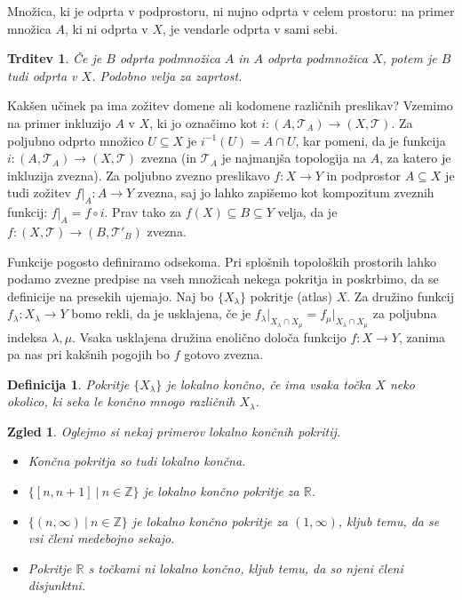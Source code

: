 \documentclass[10pt, a4paper]{article}
\newtheorem{trditev}[izr]{Trditev}
\newtheorem{defi}{Definicija}[section]
\newenvironment{noticeB}{%
  \tcolorbox[%
  notitle,
  empty,
  enhanced,  %
  breakable,
  coltext=black,
  colback=white, 
  fontupper=\rmfamily,
  parbox=false,
  noparskip,
  sharp corners,
  boxrule=-1pt,  %
  frame hidden,
  left=7pt,  %
  right=7pt,
  top=5pt,
  bottom=5pt,
  before skip=2.5ex plus 2pt,
  after skip=2.5ex plus 2pt,
  borderline west = {1.5pt}{-0.1pt}{blue!30!black}, %
  overlay unbroken and last={%
    \draw[color=black, line width=1.25pt]
    ($(frame.south west)+(1.pt, -0.1pt)$) -- ++(2em, 0);
  }
  ]}
{\endtcolorbox}
\newenvironment{definicija}{\begin{defi}\begin{noticeB}}{%
    \end{noticeB}\end{defi}}
\newtheorem{zgled}{Zgled}[section]
\newcommand{\Z}{\mathbb {Z}}
\newcommand{\R}{\mathbb {R}}
\newcommand{\topo}[1]{\mathcal{#1}}
\begin{document}
Množica, ki je odprta v podprostoru, ni nujno odprta v celem prostoru:
na primer množica $A$, ki ni odprta v $X$, je vendarle odprta v sami sebi.

\begin{trditev}
  Če je $B$ odprta podmnožica $A$ in $A$ odprta podmnožica $X$, potem je $B$ tudi odprta v $X$.
  Podobno velja za zaprtost.
\end{trditev}

Kakšen učinek pa ima zožitev domene ali kodomene različnih preslikav?
Vzemimo na primer inkluzijo $A$ v $X$, ki jo označimo kot $i: (A, \topo{T}_A) \to (X, \topo{T})$.
Za poljubno odprto množico $U \subseteq X$ je $i^{-1} (U) = A \cap U$,
kar pomeni, da je funkcija $i: (A, \topo{T}_A) \to (X, \topo{T})$ zvezna (in $\topo{T}_A$ je najmanjša topologija na $A$,
za katero je inkluzija zvezna).
Za poljubno zvezno preslikavo $f: X \to Y$ in podprostor $A \subseteq X$
je tudi zožitev $f \big|_A : A \to Y$ zvezna, saj jo lahko zapišemo kot kompozitum zveznih funkcij: $f \big|_A = f \circ i$.
Prav tako za $f(X) \subseteq B \subseteq Y$ velja, da je $f: (X, \topo{T}) \to (B, \topo{T}'_B)$ zvezna.

Funkcije pogosto definiramo odsekoma. Pri splošnih topoloških prostorih lahko podamo zvezne predpise na vseh množicah nekega pokritja
in poskrbimo, da se definicije na presekih ujemajo. Naj bo $\{X_\lambda\}$ pokritje (atlas) $X$.
Za družino funkcij $f_\lambda: X_\lambda \to Y$ bomo rekli, da je usklajena, če je 
$f_\lambda \big|_{X_\lambda \cap X_\mu} = f_\mu \big|_{X_\lambda \cap X_\mu}$ za poljubna indeksa $\lambda, \mu$.
Vsaka usklajena družina enolično določa funkcijo $f: X \to Y$, zanima pa nas pri kakšnih pogojih bo $f$ gotovo zvezna.

\begin{definicija}
  Pokritje $\{X_\lambda\}$ je lokalno končno, če ima vsaka točka $X$ neko okolico, ki seka le končno mnogo različnih $X_\lambda$.
\end{definicija}

\begin{zgled}
  Oglejmo si nekaj primerov lokalno končnih pokritij.
  \begin{itemize}
    \item Končna pokritja so tudi lokalno končna.
    \item $\{[n, n+1]\ |\ n \in \Z\}$ je lokalno končno pokritje za $\R$.
    \item $\{(n, \infty)\ |\ n \in \Z\}$ je lokalno končno pokritje za $(1, \infty)$, 
    kljub temu, da se vsi členi medebojno sekajo.
    \item Pokritje $\R$ s točkami ni lokalno končno, kljub temu, da so njeni členi disjunktni.
  \end{itemize}
\end{zgled}
\end{document}
